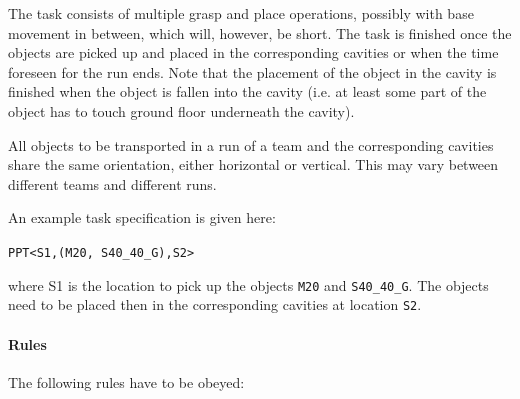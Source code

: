 The task consists of multiple grasp and place operations, possibly with base movement in between, which will, however, be short. The task is finished once the objects are picked up and placed in the corresponding cavities or when the time foreseen for the run ends. Note that the placement of the object in the cavity is finished when the object is fallen into the cavity (i.e. at least some part of the object has to touch ground floor underneath the cavity).
\par
All objects to be transported in a run of a team and the corresponding cavities share the same orientation, either horizontal or vertical. This may vary between different teams and different runs.
\par
An example task specification is given here:
\begin{center}
\texttt{PPT\textless S1,(M20, S40\_40\_G),S2\textgreater}
\end{center}
where S1 is the location to pick up the objects \texttt{M20} and \texttt{S40\_40\_G}. The objects need to be placed then in the corresponding cavities at location \texttt{S2}.
%
%
%

\paragraph{Rules}
The following rules have to be obeyed:

